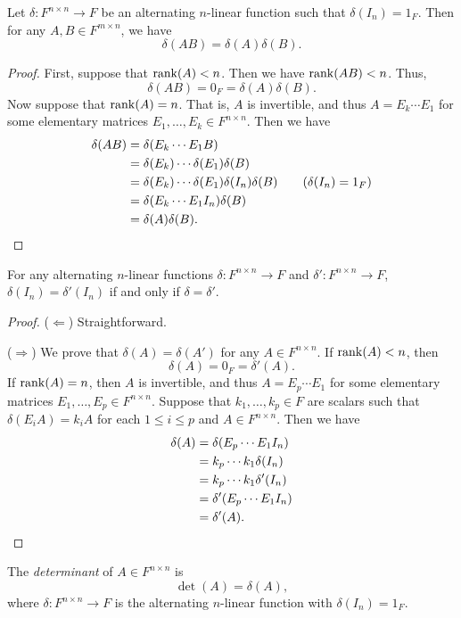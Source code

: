 \begin{theorem}
  Let $\delta: F^{n \times n} \to F$ be an alternating $n$-linear function
  such that $\delta(I_n) = 1_F$.
  Then for any $A, B \in F^{m \times n}$, we have
  \begin{equation*}
    \delta(AB) = \delta(A)\delta(B).
  \end{equation*}
\end{theorem}
\begin{proof}
  First, suppose that $\operatorname{rank}(A) < n$.
  Then we have $\operatorname{rank}(AB) < n$.
  Thus,
  \begin{equation*}
    \delta(AB) = 0_F = \delta(A)\delta(B).
  \end{equation*}
  Now suppose that $\operatorname{rank}(A) = n$.
  That is, $A$ is invertible, and thus $A = E_k \cdots E_1$ for some elementary
  matrices $E_1, \dots, E_k \in F^{n \times n}$.
  Then we have
  \begin{align*}
    \delta(AB)
    &= \delta(E_k \cdots E_1B) \\
    &= \delta(E_k) \cdots \delta(E_1)\delta(B) \\
    &= \delta(E_k) \cdots \delta(E_1)\delta(I_n)\delta(B)
       \tag{$\delta(I_n) = 1_F$} \\
    &= \delta(E_k \cdots E_1I_n)\delta(B) \\
    &= \delta(A)\delta(B).
    \qedhere
  \end{align*}
\end{proof}

\begin{theorem}
  For any alternating $n$-linear functions ${\delta: F^{n \times n} \to F}$ and
  ${\delta': F^{n \times n} \to F}$,
  $\delta(I_n) = \delta'(I_n)$ if and only if $\delta = \delta'$.
\end{theorem}
\begin{proof}
  ($\Leftarrow$) Straightforward.

  ($\Rightarrow$)
  We prove that $\delta(A) = \delta(A')$ for any $A \in F^{n \times n}$.
  If $\operatorname{rank}(A) < n$, then
  \begin{equation*}
    \delta(A) = 0_F = \delta'(A).
  \end{equation*}
  If $\operatorname{rank}(A) = n$, then $A$ is invertible, and thus $A = E_p \cdots E_1$
  for some elementary matrices $E_1, \dots, E_p \in F^{n \times n}$.
  Suppose that $k_1, \dots, k_p \in F$ are scalars such that
  $\delta(E_iA) = k_iA$ for each $1 \leq i \leq p$ and $A \in F^{n \times n}$.
  Then we have
  \begin{align*}
    \delta(A)
    &= \delta(E_p \cdots E_1I_n) \\
    &= k_p \cdots k_1\delta(I_n) \\
    &= k_p \cdots k_1\delta'(I_n) \\
    &= \delta'(E_p \cdots E_1I_n) \\
    &= \delta'(A).
    \qedhere
  \end{align*}
\end{proof}

\begin{definition}
  The \emph{determinant} of $A \in F^{n \times n}$ is
  \begin{equation*}
    \det(A) = \delta(A),
  \end{equation*}
  where $\delta: F^{n \times n} \to F$ is the alternating $n$-linear function
  with $\delta(I_n) = 1_F$.
\end{definition}
